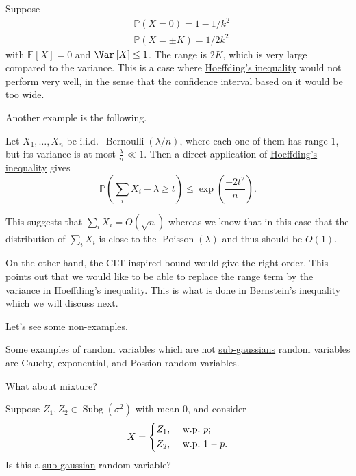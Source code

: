\begin{eg}
	Suppose
	\[
		\begin{split}
			&\mathbb{P} (X=0) = 1 - 1/k^2\\
			&\mathbb{P} (X=\pm K) = 1/2k^2
		\end{split}
	\]
	with \(\mathbb{E}_{}\left[X \right] =0\) and \(\Var_{}\left[X \right] \leq 1\). The range is \(2K\), which is very large compared to the variance. This is a case where \hyperref[thm:Hoeffding-inequality]{Hoeffding's inequality} would not perform very well, in the sense that the confidence interval based on it would be too wide.
\end{eg}

Another example is the following.

\begin{eg}
	Let \(X_1, \dots, X_n\) be i.i.d.\ \(\mathop{\mathrm{Bernoulli}}(\lambda / n)\), where each one of them has range \(1\), but its variance is at most \(\frac{\lambda}{n} \ll 1\). Then a direct application of \hyperref[thm:Hoeffding-inequality]{Hoeffding's inequality} gives
	\[
		\mathbb{P} \left( \sum_{i} X_i - \lambda \geq t \right) \leq \exp\left( \frac{-2t^2}{n} \right) .
	\]

	This suggests that \(\sum_{i} X_i = O(\sqrt{n})\) whereas we know that in this case that the distribution of \(\sum_{i} X_i\) is close to the \(\mathop{\mathrm{Poisson }}(\lambda)\) and thus should be \(O(1)\).

	On the other hand, the CLT inspired bound would give the right order. This points out that we would like to be able to replace the range term by the variance in \hyperref[thm:Hoeffding-inequality]{Hoeffding's inequality}. This is what is done in \hyperref[thm:Bernstein-inequality]{Bernstein's inequality} which we will discuss next.
\end{eg}

Let's see some non-examples.

\begin{eg}
	Some examples of random variables which are not \hyperref[def:sub-gaussian]{sub-gaussians} random variables are Cauchy, exponential, and Possion random variables.
\end{eg}

What about mixture?

\begin{problem*}
	Suppose \(Z_1, Z_2 \in \mathop{\mathrm{Subg}}(\sigma ^{2} ) \) with mean \(0\), and consider
	\[
		X = \begin{dcases}
			Z_1, & \text{ w.p.\ } p ;   \\
			Z_2, & \text{ w.p.\ } 1-p .
		\end{dcases}
	\]
	Is this a \hyperref[def:sub-gaussian]{sub-gaussian} random variable?
\end{problem*}

